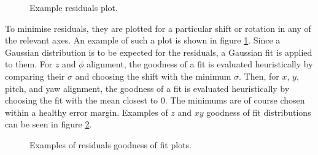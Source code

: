     \begin{figure}[b!]
        \centering{}
        \caption{Example residuals plot.}
        \label{fig::res_example}
    \end{figure}

    To minimise residuals, they are plotted for a particular shift or rotation in any of the relevant axes.
    An example of such a plot is shown in figure \ref{fig::res_example}.
    Since a Gaussian distribution is to be expected for the residuals, a Gaussian fit is applied to them.
    For $z$ and $\phi$ alignment, the goodness of a fit is evaluated heuristically by comparing their $\sigma$ and choosing the shift with the minimum $\sigma$.
    Then, for $x$, $y$, pitch, and yaw alignment, the goodness of a fit is evaluated heuristically by choosing the fit with the mean closest to $0$.
    The minimums are of course chosen within a healthy error margin.
    Examples of $z$ and $xy$ goodness of fit distributions can be seen in figure \ref{fig::resfit_example}.
    
    \begin{figure}[t!]
        \centering{}
        \caption{Examples of residuals goodness of fit plots.}
        \label{fig::resfit_example}
    \end{figure}

